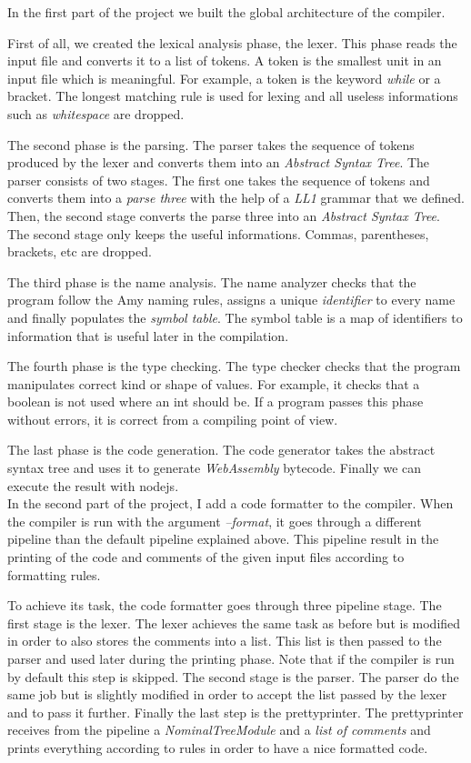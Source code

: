 In the first part of the project we built the global architecture of the compiler. 

First of all, we created the lexical analysis phase, the lexer. This phase reads the input file and converts it to a list of tokens. A token is the smallest unit in an input file which is meaningful. For example, a token is the keyword \emph{while} or a bracket. The longest matching rule is used for lexing and all useless informations such as \emph{whitespace} are dropped.

The second phase is the parsing. The parser takes the sequence of tokens produced by the lexer and converts them into an \emph{Abstract Syntax Tree}. The parser consists of two stages. The first one takes the sequence of tokens and converts them into a \emph{parse three} with the help of a \emph{LL1} grammar that we defined. Then, the second stage converts the parse three into an \emph{Abstract Syntax Tree}. The second stage only keeps the useful informations. Commas, parentheses, brackets, etc are dropped.

The third phase is the name analysis. The name analyzer checks that the program follow the Amy naming rules, assigns a unique \emph{identifier} to every name and finally populates the \emph{symbol table}. The symbol table is a map of identifiers to information that is useful later in the compilation.

The fourth phase is the type checking. The type checker checks that the program manipulates correct kind or shape of values. For example, it checks that a boolean is not used where an int should be. If a program passes this phase without errors, it is correct from a compiling point of view.

The last phase is the code generation. The code generator takes the abstract syntax tree and uses it to generate \emph{WebAssembly} bytecode. Finally we can execute the result with nodejs.\\

In the second part of the project, I add a code formatter to the compiler. When the compiler is run with the argument \emph{--format}, it goes through a different pipeline than the default pipeline explained above. This pipeline result in the printing of the code and comments of the given input files according to formatting rules.

To achieve its task, the code formatter goes through three pipeline stage.
The first stage is the lexer. The lexer achieves the same task as before but is modified in order to also stores the comments into a list. This list is then passed to the parser and used later during the printing phase. Note that if the compiler is run by default this step is skipped.
The second stage is the parser. The parser do the same job but is slightly modified in order to accept the list passed by the lexer and to pass it further. 
Finally the last step is the prettyprinter. The prettyprinter receives from the pipeline a \emph{NominalTreeModule} and a \emph{list of comments} and prints everything according to rules in order to have a nice formatted code.




